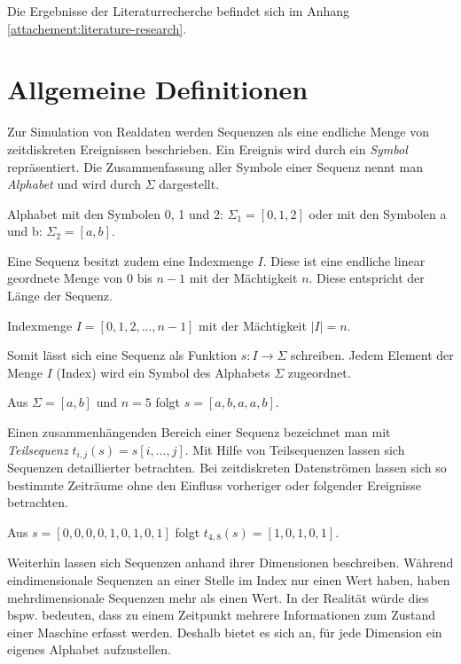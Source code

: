 Die Ergebnisse der Literaturrecherche befindet sich im Anhang \ref{attachement:literature-research}. 

\section{Allgemeine Definitionen}
\label{chp:definitions-sequences}
Zur Simulation von Realdaten werden Sequenzen als eine endliche Menge von zeitdiskreten Ereignissen beschrieben. Ein Ereignis wird durch ein \textit{Symbol} repräsentiert. Die Zusammenfassung aller  Symbole einer Sequenz nennt man \textit{Alphabet} und wird durch $\Sigma$ dargestellt.

\begin{theorem}
Alphabet mit den Symbolen 0, 1 und 2: $\Sigma_1 = [0,1,2]$ oder mit den Symbolen a und b: $\Sigma_2 = [a,b]$. 
\end{theorem}

Eine Sequenz besitzt zudem eine Indexmenge $I$. Diese ist eine endliche linear geordnete Menge von 0 bis $n-1$ mit der Mächtigkeit $n$. Diese entspricht der Länge der Sequenz.

\begin{theorem}
Indexmenge $I = [0,1,2,...,n-1]$ mit der Mächtigkeit $|I| = n$.
\end{theorem}

Somit lässt sich eine Sequenz als Funktion $s : I \rightarrow \Sigma$ schreiben. Jedem Element der Menge $I$ (Index) wird ein Symbol des Alphabets $\Sigma$ zugeordnet.

\begin{theorem}
Aus $\Sigma = [a,b]$ und $n = 5$ folgt $s = [a,b,a,a,b]$.
\end{theorem}

Einen zusammenhängenden Bereich einer Sequenz bezeichnet man mit \textit{Teilsequenz} $t_{i,j}(s) = s[i,...,j]$. Mit Hilfe von Teilsequenzen lassen sich Sequenzen detaillierter betrachten. Bei zeitdiskreten Datenströmen lassen sich so bestimmte Zeiträume ohne den Einfluss vorheriger oder folgender Ereignisse betrachten. 

\begin{theorem}
Aus $s = [0,0,0,0,1,0,1,0,1]$ folgt $t_{4,8}(s) = [1,0,1,0,1] $.
\end{theorem}

Weiterhin lassen sich Sequenzen anhand ihrer Dimensionen beschreiben. Während eindimensionale Sequenzen an einer Stelle im Index nur einen Wert haben, haben mehrdimensionale Sequenzen mehr als einen Wert. In der Realität würde dies bspw. bedeuten, dass zu einem Zeitpunkt mehrere Informationen zum Zustand einer Maschine erfasst werden. Deshalb bietet es sich an, für jede Dimension ein eigenes Alphabet aufzustellen.

